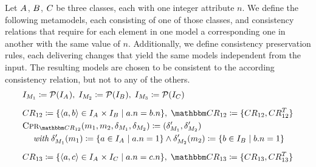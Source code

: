 Let $\class{A}{}$, $\class{B}{}$, $\class{C}{}$ be three classes, each with one integer attribute $n$.
We define the following metamodels, each consisting of one of those classes, and consistency relations that require for each element in one model a corresponding one in another with the same value of $n$. %
Additionally, we define consistency preservation rules, each delivering changes that yield the same models independent from the input.
The resulting models are chosen to be consistent to the according consistency relation, but not to any of the others.
%
\begin{align*}
    & 
    \metamodelinstanceset{M}{1} \equalsperdefinition \mathcal{P}(\instances{\class{A}{}}), \;%
    \metamodelinstanceset{M}{2} \equalsperdefinition \mathcal{P}(\instances{\class{B}{}}), \;%
    \metamodelinstanceset{M}{3} \equalsperdefinition \mathcal{P}(\instances{\class{C}{}}) \\[0.5em]
    &
    \consistencyrelation{CR}{12} \equalsperdefinition \setted{\tupled{a,b} \in \instances{\class{A}{}} \times \instances{\class{B}{}} \mid a.n = b.n}, \;
    \consistencyrelationset{CR}_{12} \equalsperdefinition \setted{\consistencyrelation{CR}{12}, \consistencyrelation{CR}{12}^T} \\
    &
    \consistencypreservationrule{\consistencyrelationset{CR}_{12}}(\model{m}{1}, \model{m}{2}, \change{\metamodel{M}{1}}, \change{\metamodel{M}{2}}) \equalsperdefinition (\change{\metamodel{M}{1}}', \change{\metamodel{M}{2}}') \\
    & \formulaskip
        \withmath \change{\metamodel{M}{1}}'(\model{m}{1}) \equalsperdefinition \setted{a \in \instances{\class{A}{}} \mid a.n = 1} \land \change{\metamodel{M}{2}}'(\model{m}{2}) \equalsperdefinition \setted{b \in \instances{\class{B}{}} \mid b.n = 1} \\[0.5em]
    &
    \consistencyrelation{CR}{13} \equalsperdefinition \setted{\tupled{a,c} \in \instances{\class{A}{}} \times \instances{\class{C}{}} \mid a.n = c.n}, \;
    \consistencyrelationset{CR}_{13} \equalsperdefinition \setted{\consistencyrelation{CR}{13}, \consistencyrelation{CR}{13}^T} \\

\end{align*}
